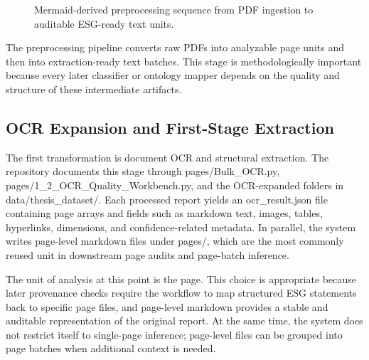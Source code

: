 \begin{figure}[ht]
\begin{center}
\end{center}
\caption{Mermaid-derived preprocessing sequence from PDF ingestion to auditable ESG-ready text units.}
\label{fig:implementation-preprocessing}
\end{figure}

The preprocessing pipeline converts raw PDFs into analyzable page units and then into extraction-ready text batches. This stage is methodologically important because every later classifier or ontology mapper depends on the quality and structure of these intermediate artifacts.

\subsection{OCR Expansion and First-Stage Extraction}

The first transformation is document OCR and structural extraction. The repository documents this stage through pages/Bulk\_OCR.py, pages/1\_2\_OCR\_Quality\_Workbench.py, and the OCR-expanded folders in data/thesis\_dataset/. Each processed report yields an ocr\_result.json file containing page arrays and fields such as markdown text, images, tables, hyperlinks, dimensions, and confidence-related metadata. In parallel, the system writes page-level markdown files under pages/, which are the most commonly reused unit in downstream page audits and page-batch inference.

The unit of analysis at this point is the page. This choice is appropriate because later provenance checks require the workflow to map structured ESG statements back to specific page files, and page-level markdown provides a stable and auditable representation of the original report. At the same time, the system does not restrict itself to single-page inference; page-level files can be grouped into page batches when additional context is needed.


